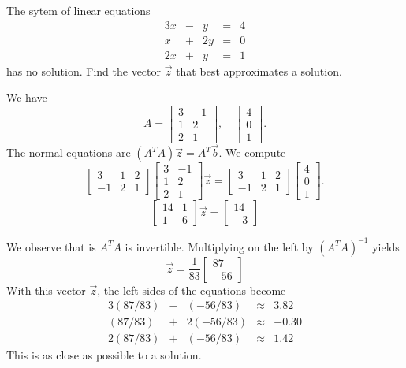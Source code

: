 \documentclass{ximera}
\begin{document}
    \begin{example}\label{ex:leastSq2}
        The sytem of linear equations
        $$\begin{matrix}3x & - & y&=&4\\x&+&2y&=&0\\2x&+&y&=&1\end{matrix}$$
        has no solution.  Find the vector $\vec{z}$ that best approximates a solution.

        \begin{explanation}            
            We have $$A=\begin{bmatrix}3&-1\\1&2\\2&1\end{bmatrix},\quad\begin{bmatrix}4\\0\\1\end{bmatrix}.$$ 
            The normal equations are $\left(A^TA\right)\vec{z}=A^T\vec{b}$.  We compute
                       $$\begin{bmatrix}3&1&2\\-1&2&1\end{bmatrix}\begin{bmatrix}3&-1\\1&2\\2&1\end{bmatrix}\vec{z}=\begin{bmatrix}3&1&2\\-1&2&1\end{bmatrix}\begin{bmatrix}4\\0\\1\end{bmatrix}.$$
                       $$\begin{bmatrix}14&1\\1&6\end{bmatrix}\vec{z}=\begin{bmatrix}14\\-3\end{bmatrix}$$ 
            
            
            We observe that is $A^TA$ is invertible. 
 Multiplying on the left by $(A^TA)^{-1}$ yields $$\vec{z}=\frac{1}{83}\begin{bmatrix}87\\-56\end{bmatrix}$$
            With this vector $\vec{z}$, the left sides of the equations become
            $$\begin{matrix}3(87/83) & - & (-56/83)&\approx&3.82\\(87/83)&+&2(-56/83)&\approx&-0.30\\2(87/83)&+&(-56/83)&\approx&1.42\end{matrix}$$
            This is as close as possible to a solution.
        \end{explanation}
    \end{example}
\end{document}
